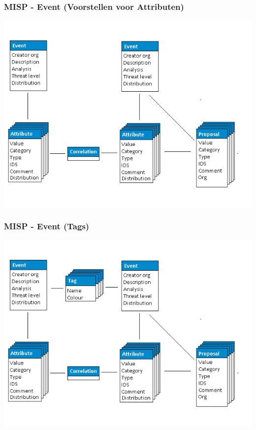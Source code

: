 \begin{frame}
    \frametitle{MISP - Event \newline (Voorstellen voor Attributen)}
    \includegraphics[scale=0.45]{screenshots/datamodel4.png}
\end{frame}

\begin{frame}
    \frametitle{MISP - Event (Tags)}
    \includegraphics[scale=0.45]{screenshots/datamodel5.png}
\end{frame}

